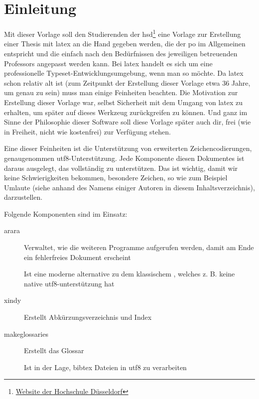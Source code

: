 
\newpage

\section{Einleitung}%
\label{sec:einl}
Mit dieser Vorlage soll den Studierenden der \gls{hsd}\footnote{\href{https://www.hs-duesseldorf.de}{Website der Hochschule Düsseldorf}} eine Vorlage zur Erstellung einer Thesis mit \gls{latex} an die Hand gegeben werden, die der \gls{po} im Allgemeinen entspricht und die einfach nach den Bedürfnissen des jeweiligen betreuenden Professors angepasst werden kann. Bei \gls{latex} handelt es sich um eine \glqq professionelle Typeset-Entwicklungsumgebung\grqq, wenn man so möchte. Da \gls{latex} schon
relativ alt ist (zum Zeitpunkt der Erstellung dieser Vorlage etwa 36 Jahre, um genau zu sein) muss man einige Feinheiten beachten. Die Motivation zur Erstellung dieser Vorlage war, selbst Sicherheit mit dem Umgang von \gls{latex} zu erhalten, um später auf dieses Werkzeug zurückgreifen zu können. Und ganz im Sinne der Philosophie dieser Software soll diese Vorlage später auch dir, frei (wie in Freiheit, nicht wie kostenfrei) zur Verfügung stehen.

Eine dieser Feinheiten ist die Unterstützung von erweiterten Zeichencodierungen, genaugenommen \gls{utf8}-Unterstützung.
Jede Komponente diesen Dokumentes ist daraus ausgelegt, das vollständig zu unterstützen. Das ist wichtig, damit wir keine Schwierigkeiten bekommen, \glqq besondere Zeichen\grqq, so wie zum Beispiel Umlaute (siehe anhand des Namens einiger Autoren in diesem Inhaltsverzeichnis), darzustellen.

Folgende Komponenten sind im Einsatz:
\begin{description}
  \item[arara] Verwaltet, wie die weiteren Programme aufgerufen werden, damit am Ende ein fehlerfreies Dokument erscheint
  \item[\protect{}] Ist eine moderne alternative zu dem klassischem \glqq {}\grqq , welches z. B. keine native \gls{utf8}-unterstützung hat
  \item[xindy] Erstellt Abkürzungsverzeichnis und Index
  \item[makeglossaries] Erstellt das Glossar
  \item[\protect{}] Ist in der Lage, bibtex Dateien in \gls{utf8} zu verarbeiten
\end{description}

